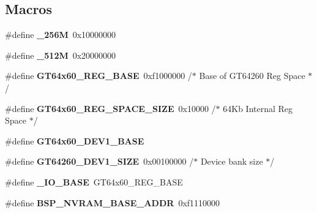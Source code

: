 \subsection*{Macros}
\begin{DoxyCompactItemize}
\item 
\mbox{\label{group__RTEMSBSPsPowerPCMVME5500_ga9bf6a77e1023d72be501f096c391c153}} 
\#define {\bfseries \+\_\+256M}~0x10000000
\item 
\mbox{\label{group__RTEMSBSPsPowerPCMVME5500_ga65de0440fde808092b2a3a07607a3652}} 
\#define {\bfseries \+\_\+512M}~0x20000000
\item 
\mbox{\label{group__RTEMSBSPsPowerPCMVME5500_ga6c54261231f31b0acaa07b3a7f75760a}} 
\#define {\bfseries G\+T64x60\+\_\+\+R\+E\+G\+\_\+\+B\+A\+SE}~0xf1000000  /$\ast$ Base of G\+T64260 Reg Space $\ast$/
\item 
\mbox{\label{group__RTEMSBSPsPowerPCMVME5500_ga0bb992578b4df4063b51fcdabd08dfb1}} 
\#define {\bfseries G\+T64x60\+\_\+\+R\+E\+G\+\_\+\+S\+P\+A\+C\+E\+\_\+\+S\+I\+ZE}~0x10000     /$\ast$ 64\+Kb Internal Reg Space $\ast$/
\item 
\#define {\bfseries G\+T64x60\+\_\+\+D\+E\+V1\+\_\+\+B\+A\+SE}
\item 
\mbox{\label{group__RTEMSBSPsPowerPCMVME5500_ga96dbca442498145f759f72d8416e6d3f}} 
\#define {\bfseries G\+T64260\+\_\+\+D\+E\+V1\+\_\+\+S\+I\+ZE}~0x00100000 /$\ast$ Device bank size $\ast$/
\item 
\mbox{\label{group__RTEMSBSPsPowerPCMVME5500_gabb10b3234ab8ab0c01ae7bf8e75d9031}} 
\#define {\bfseries \+\_\+\+I\+O\+\_\+\+B\+A\+SE}~G\+T64x60\+\_\+\+R\+E\+G\+\_\+\+B\+A\+SE
\item 
\mbox{\label{group__RTEMSBSPsPowerPCMVME5500_ga3609a9801d78442aec42a447d34a5af0}} 
\#define {\bfseries B\+S\+P\+\_\+\+N\+V\+R\+A\+M\+\_\+\+B\+A\+S\+E\+\_\+\+A\+D\+DR}~0xf1110000
\item 
\mbox{\label{group__RTEMSBSPsPowerPCMVME5500_gab7545151ce17b96a3bd39bf3ff448dea}} 

\end{DoxyCompactItemize}
